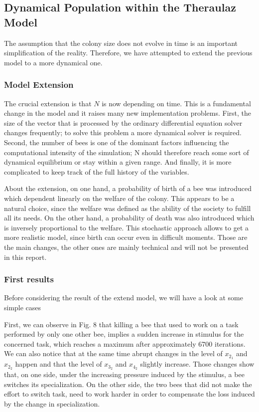 \subsection{Dynamical Population within the Theraulaz Model}

The assumption that the colony size does not evolve in time is an
important simplification of the reality. Therefore, we have attempted
to extend the previous model to a more dynamical one.


\subsubsection{Model Extension}

The crucial extension is that $N$ is now depending on time. This
is a fundamental change in the model and it raises many new implementation
problems. First, the size of the vector that is processed by the ordinary
differential equation solver changes frequently; to solve this problem
a more dynamical solver is required. Second, the number of bees is
one of the dominant factors influencing the computational intensity
of the simulation; N should therefore reach some sort of dynamical
equilibrium or stay within a given range. And finally, it is more complicated
to keep track of the full history of the variables.

About the extension, on one hand, a probability of birth of a
bee was introduced which dependent linearly on the welfare of the
colony. This appears to be a natural choice, since the welfare was
defined as the ability of the society to fulfill all its needs. On
the other hand, a probability of death was also introduced which is
inversely proportional to the welfare. This stochastic
approach allows to get a more realistic model, since birth can occur
even in difficult moments. Those are the main changes, the other ones
are mainly technical and will not be presented in this report.

\subsubsection{First results}

Before considering the result of the extend model, we will have a look
at some simple cases

First, we can observe in Fig. 8 that killing a bee that used
to work on a task performed by only one other bee, implies a sudden increase in stimulus for the concerned task, which reaches a maximum after approximately 6700 iterations. We can also notice that at the same time abrupt changes in the level of $x_2_1$ and $x_2_2$ happen and that the level of $x_3_2$ and $x_4_2$ slightly increase. Those changes show that, on one side, under the increasing pressure induced by the stimulus, a bee switches its specialization. On the other side, the two bees that did not make the effort to switch task, need to work harder in order to compensate the loss induced by the change in specialization.


